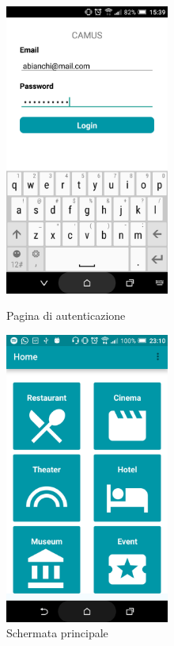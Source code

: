 \begin{figure}[h]
	\begin{minipage}{0.5\textwidth}
		\centering
		\includegraphics[width=0.48\textwidth]{4-progettazione-alto-livello/Immagini/login_caso_d'uso.png}
		\caption{Pagina di autenticazione}\label{fig:usecase-login}
	\end{minipage}
	\begin{minipage}{0.5\textwidth}
		\centering
		\includegraphics[width=0.48\textwidth]{4-progettazione-alto-livello/Immagini/home_caso_d'uso.png}
		\caption{Schermata principale}\label{fig:usecase-home}
	\end{minipage}
\end{figure}

